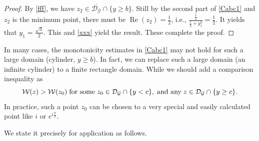 \documentclass[reqno,english]{amsart}
\newtheorem{open problem}{Open Problem}[section]
\newtheorem{open question}{Open Question}[section]
\newtheorem{open questions on hexagonal lattice}{Open Questions on hexagonal lattice}[section]
\renewcommand{\Re}{\operatorname{Re}}
\begin{document}
\begin{proof}
By \eqref{fff}, we have $z_2\in\overline{\mathcal{D}_{\mathcal{G}}}\cap\{y\geq b\}$. Still by the second part of \eqref{Cabc1} and $z_2$ is the minimum point, there must be $\Re(z_2)=\frac{1}{2}$, i.e., $\frac{\frac{1}{2}}{\frac{1}{4}+y_1^2}=\frac{1}{2}$. It yields that $y_1=\frac{\sqrt3}{2}$. This and \eqref{xxx} yield the result. These complete the proof.


\end{proof}
In many cases, the monotonicity estimates in \eqref{Cabc1} may not hold for such a large domain (cylinder, $y\geq b$). In fact, we can replace such a large domain (an infinite cylinder) to a finite rectangle domain. While we should add a comparison inequality as
$$\mathcal{W}(z)>\mathcal{W}(z_0) \;\hbox{for some}\; z_0\in\mathcal{D}_{\mathcal{G}}\cap\{y< c\}, \;\hbox{and any}\; z\in\mathcal{D}_{\mathcal{G}}\cap\{y\geq c\}.$$
In practice, such a point $z_0$ can be chosen to a very special and easily calculated point like $i$ or $e^{i\frac{\pi}{3}}$.

We state it precisely for  application as follows.
\end{document}
